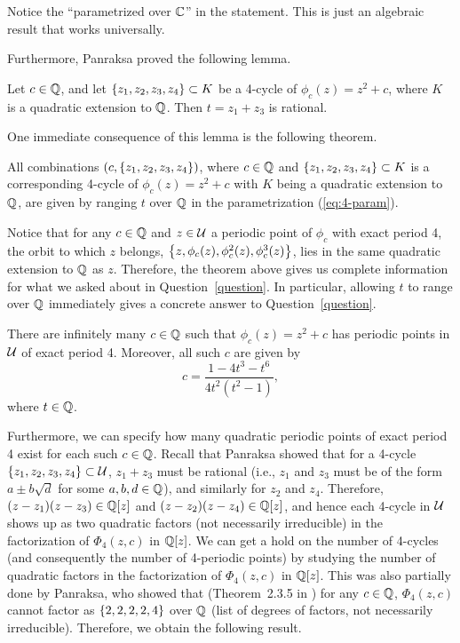 \begin{remark}
  Notice the ``parametrized over $\mathbb{C}$'' in the statement. This is just
  an algebraic result that works universally.
\end{remark}

Furthermore, Panraksa \cite{MR2982105} proved the following lemma.

\begin{lemma}
  \label{lem:z1+z3}
  Let $c \in \mathbb{Q}$, and let $\left\{z_1, z_2, z_3, z_4\right\} \subset K$ be a
  4-cycle of $\phi_c(z) = z^2 + c$, where $K$ is a quadratic extension
  to $\mathbb{Q}$. Then $t = z_1 + z_3$ is rational.
\end{lemma}

One immediate consequence of this lemma is the following theorem.

\begin{theorem} 
  \label{th:all}
  All combinations $(c, \left\{z_1, z_2, z_3, z_4\right\})$, where $c \in \mathbb{Q}$
  and $\left\{z_1, z_2, z_3, z_4\right\} \subset K$ is a corresponding 4-cycle
  of $\phi_c(z) = z^2 + c$ with $K$ being a quadratic extension to
  $\mathbb{Q}$, are given by ranging $t$ over $\mathbb{Q}$ in the parametrization
  (\ref{eq:4-param}).
\end{theorem}

Notice that for any $c \in \mathbb{Q}$ and $z \in \mathcal{U}$ a periodic point of
$\phi_c$ with exact period 4, the orbit to which $z$ belongs, $\left\{z,
  \phi_c(z), \phi_c^2(z), \phi_c^3(z)\right\}$, lies in the same quadratic
extension to $\mathbb{Q}$ as $z$. Therefore, the theorem above gives us
complete information for what we asked about in
Question~\ref{question}. In particular, allowing $t$ to range over
$\mathbb{Q}$ immediately gives a concrete answer to Question~\ref{question}.

\begin{corollary}
  There are infinitely many $c \in \mathbb{Q}$ such that $\phi_c(z) = z^2 + c$
  has periodic points in $\mathcal{U}$ of exact period 4. Moreover, all such
  $c$ are given by
  \[
  \label{eq:c-param}
  c = \frac{1 - 4t^3 - t^6}{4t^2(t^2 - 1)},
  \]
  where $t \in \mathbb{Q}$.
\end{corollary}

Furthermore, we can specify how many quadratic periodic points of
exact period 4 exist for each such $c \in \mathbb{Q}$. Recall that Panraksa
showed that for a 4-cycle $\left\{z_1, z_2, z_3, z_4\right\} \subset \mathcal{U}$, $z_1
+ z_3$ must be rational (i.e., $z_1$ and $z_3$ must be of the form $a
\pm b \sqrt{d}$ for some $a, b, d \in \mathbb{Q}$), and similarly for $z_2$
and $z_4$. Therefore, $(z - z_1)(z - z_3) \in \mathbb{Q}[z]$ and $(z - z_2)(z
- z_4) \in \mathbb{Q}[z]$, and hence each 4-cycle in $\mathcal{U}$ shows up as two
quadratic factors (not necessarily irreducible) in the factorization
of $\Phi_4(z, c)$ in $\mathbb{Q}[z]$. We can get a hold on the number of
4-cycles (and consequently the number of 4-periodic points) by
studying the number of quadratic factors in the factorization of
$\Phi_4(z, c)$ in $\mathbb{Q}[z]$. This was also partially done by Panraksa,
who showed that (Theorem~2.3.5 in \cite{MR2982105}) for any $c \in
\mathbb{Q}$, $\Phi_4(z, c)$ cannot factor as $\left\{2, 2, 2, 2, 4\right\}$ over $\mathbb{Q}$
(list of degrees of factors, not necessarily irreducible). Therefore,
we obtain the following result.

